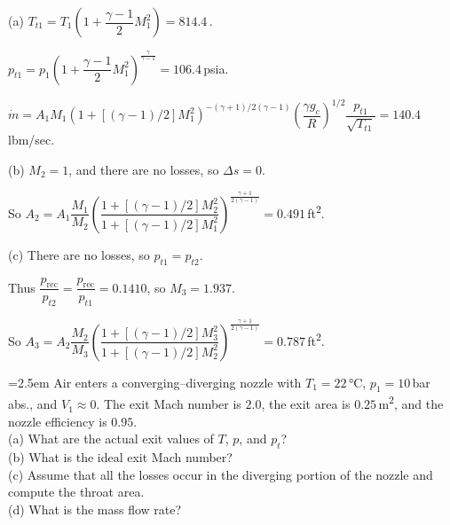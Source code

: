 \documentclass[12pt]{article}
\newlength{\questionlabelwidth}
\newcommand{\question}[2]{%
  \par\noindent
  {\hangindent=2.5em %
   \hangafter=1 %
   \makebox[\questionlabelwidth][l]{\textbf{#1}}#2\par}%
}
\begin{document}
\begin{answerbox}
(a) $T_{t1}=T_1\left(1+\dfrac{\gamma-1}{2}M_1^2\right)=814.4$\,\si{\Rankine}.

$p_{t1}=p_1\left(1+\dfrac{\gamma-1}{2}M_1^2\right)^{\frac{\gamma}{\gamma -1}}=106.4$\,\si{psia}.

$\dot{m}=A_1M_1\left(1+[(\gamma -1)/2]M_1^2\right)^{-(\gamma +1)/2(\gamma -1)}\left(\dfrac{\gamma g_c}{R}\right)^{1/2}\dfrac{p_{t1}}{\sqrt{T_{t1}}}=140.4$\,\si{lbm/sec}.

(b) $M_2=1$, and there are no losses, so $\Delta s=0$.

So $A_2=A_1\dfrac{M_1}{M_2}\left(\dfrac{1+[(\gamma -1)/2]M_2^2}{1+[(\gamma -1)/2]M_1^2}\right)^{\frac{\gamma+1}{2(\gamma -1)}}=0.491$\,\si{ft^2}.

(c) There are no losses, so $p_{t1}=p_{t2}$.

Thus $\dfrac{p_{\text{rec}}}{p_{t2}}=\dfrac{p_{\text{rec}}}{p_{t1}}=0.1410$, so $M_3=1.937$.

So $A_3=A_2\dfrac{M_2}{M_3}\left(\dfrac{1+[(\gamma -1)/2]M_3^2}{1+[(\gamma -1)/2]M_2^2}\right)^{\frac{\gamma+1}{2(\gamma -1)}}=0.787$\,\si{ft^2}.
\end{answerbox}

\question{5.19}{Air enters a converging–diverging nozzle with $T_1=22$\,\si{\celsius}, $p_1=10$\,\si{bar} abs., and $V_1\approx 0$. The exit Mach number is $2.0$, the exit area is $0.25$\,\si{m^2}, and the nozzle efficiency is $0.95$.\\
(a)	What are the actual exit values of $T$, $p$, and $p_t$?\\
(b)	What is the ideal exit Mach number?\\
(c)	Assume that all the losses occur in the diverging portion of the nozzle and compute the throat area.\\
(d)	What is the mass flow rate?
}
\end{document}
